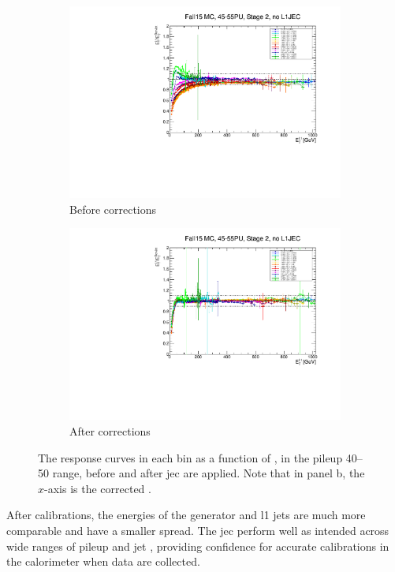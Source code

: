 \begin{figure}[htbp]
    \centering
    \begin{subfigure}[b]{0.45\textwidth}
        \includegraphics[width=\textwidth]{./figures/jecs/response_before.pdf}
        \caption{Before corrections}
        \label{fig:detector_jecs_response_before}
    \end{subfigure}
    \hfill
    \begin{subfigure}[b]{0.45\textwidth}
        \includegraphics[width=\textwidth]{./figures/jecs/response_after.pdf}
        \caption{After corrections}
        \label{fig:detector_jecs_response_after}
    \end{subfigure}
\caption[The response curves in each \abseta bin as a function of \ptLOne, in the pileup 40--50 range, before and after jet energy corrections are applied]{The response curves in each \abseta bin as a function of \ptLOne, in the \gls{pileup} 40--50 range, before and after \gls{jec} are applied. Note that in panel b, the $x$-axis is the corrected \ptLOne.}
\label{fig:detector_jecs_response}
\end{figure}

After calibrations, the energies of the generator and \acrshort{l1} \glspl{jet} are much more comparable and have a smaller spread. The \acrlong{jec} perform well as intended across wide ranges of pileup and \gls{jet} \pt, providing confidence for accurate calibrations in the calorimeter when data are collected.
